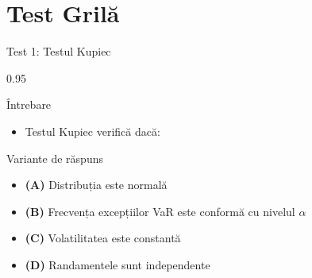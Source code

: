 \documentclass[9pt, aspectratio=169, t]{beamer}
\begin{document}
\section{Test Grilă}

\begin{frame}{Test 1: Testul Kupiec}
    \begin{cminipage}{0.95\textwidth}
    \begin{alertblock}{Întrebare}
        \begin{itemize}\setlength{\itemsep}{0pt}
            \item Testul Kupiec verifică dacă:
        \end{itemize}
    \end{alertblock}

    \begin{block}{Variante de răspuns}
    \begin{itemize}\setlength{\itemsep}{0pt}
        \item \textcolor{MainBlue}{\textbf{(A)}} Distribuția este normală
        \item \textcolor{MainBlue}{\textbf{(B)}} Frecvența excepțiilor VaR este conformă cu nivelul $\alpha$
        \item \textcolor{MainBlue}{\textbf{(C)}} Volatilitatea este constantă
        \item \textcolor{MainBlue}{\textbf{(D)}} Randamentele sunt independente
    \end{itemize}
    \end{block}
    \end{cminipage}
\end{frame}
\end{document}
